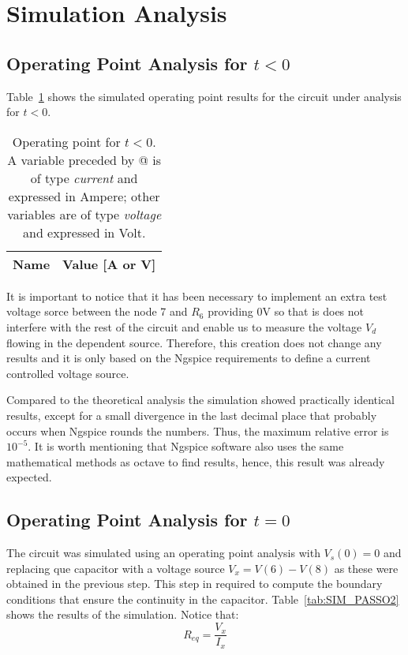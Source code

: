 \section{Simulation Analysis }
\label{sec:simulation}

\subsection{Operating Point Analysis for $t<0$}

Table~\ref{tab:SIM_PASSO1} shows the simulated operating point results for the circuit under analysis for $t<0$.
\begin{table}[h]
  \centering
  \begin{tabular}{|l|r|}
    \hline    
    {\bf Name} & {\bf Value [A or V]} \\ \hline
    
  \end{tabular}
  \caption{Operating point for $t<0$. A variable preceded by @ is of type {\em current}
    and expressed in Ampere; other variables are of type {\it voltage} and expressed in
    Volt.}
  \label{tab:SIM_PASSO1}
\end{table}

It is important to notice that it has been necessary to implement an extra test voltage sorce  between the node 7 and $R_6$ providing 0V so that is does not interfere with the rest of the circuit and enable us to measure the voltage $V_d$ flowing in the dependent source. Therefore, this creation does not change any results and it is only based on the Ngspice requirements to define a current controlled voltage source.

Compared to the theoretical analysis the simulation showed practically identical results, except for a small divergence in the last decimal place that probably occurs when Ngspice rounds the numbers. Thus, the maximum relative error is $10^{-5}$. It is worth mentioning that Ngspice software also uses the same mathematical methods as octave to find results, hence, this result was already expected.


\subsection{Operating Point Analysis for $t=0$}

The circuit was simulated using an operating point analysis with $V_s(0)=0$ and replacing que capacitor with a voltage source $V_x=V(6)-V(8)$ as these were obtained in the previous step. This step in required to compute the boundary conditions that ensure the continuity in the capacitor. Table~\ref{tab:SIM_PASSO2} shows the results of the simulation. Notice that:  \begin{equation}
R_{eq}=\frac{V_{x}}{I_{x}}
\end{equation}

